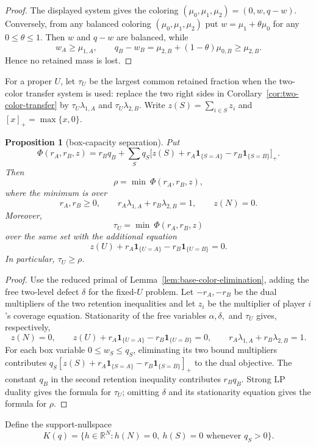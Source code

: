 \documentclass[11pt]{article}
\newtheorem{proposition}[theorem]{Proposition}
\begin{document}
\begin{proof}
The displayed system gives the coloring
$(\mu_0,\mu_1,\mu_2)=(0,w,q-w)$. Conversely, from any balanced coloring
$(\mu_0,\mu_1,\mu_2)$ put
$w=\mu_1+\theta\mu_0$ for any $0\leq\theta\leq1$. Then $w$ and $q-w$ are
balanced, while
\[
 w_A\geq\mu_{1,A},\qquad
 q_B-w_B=\mu_{2,B}+(1-\theta)\mu_{0,B}\geq\mu_{2,B}.
\]
Hence no retained mass is lost.
\end{proof}

For a proper $U$, let $\tau_U$ be the largest common retained fraction when
the two-color transfer system is used: replace the two right sides in
Corollary~\ref{cor:two-color-transfer} by
$\tau_U\lambda_{1,A}$ and $\tau_U\lambda_{2,B}$. Write
$z(S)=\sum_{i\in S}z_i$ and $[x]_+=\max\{x,0\}$.

\begin{proposition}[box-capacity separation]
\label{prop:box-capacity-dual}
Put
\[
 \Phi(r_A,r_B,z)=r_Bq_B+
 \sum_Sq_S\bigl[z(S)+r_A\mathbf1_{\{S=A\}}
                         -r_B\mathbf1_{\{S=B\}}\bigr]_+.
\]
Then
\[
 \rho=\min\ \Phi(r_A,r_B,z),
\]
where the minimum is over
\[
 r_A,r_B\geq0,\qquad
 r_A\lambda_{1,A}+r_B\lambda_{2,B}=1,\qquad z(N)=0.
\]
Moreover,
\[
 \tau_U=\min\ \Phi(r_A,r_B,z)
\]
over the same set with the additional equation
\[
 z(U)+r_A\mathbf1_{\{U=A\}}-r_B\mathbf1_{\{U=B\}}=0.
\]
In particular, $\tau_U\geq\rho$.
\end{proposition}

\begin{proof}
Use the reduced primal of Lemma~\ref{lem:base-color-elimination}, adding the
free two-level defect $\delta$ for the fixed-$U$ problem. Let $-r_A,-r_B$
be the dual multipliers of the two retention inequalities and let $z_i$ be
the multiplier of player $i$'s coverage equation. Stationarity of the free
variables $\alpha,\delta,$ and $\tau_U$ gives, respectively,
\[
 z(N)=0,\qquad
 z(U)+r_A\mathbf1_{\{U=A\}}-r_B\mathbf1_{\{U=B\}}=0,\qquad
 r_A\lambda_{1,A}+r_B\lambda_{2,B}=1.
\]
For each box variable $0\leq w_S\leq q_S$, eliminating its two bound
multipliers contributes
$q_S[z(S)+r_A\mathbf1_{\{S=A\}}-r_B\mathbf1_{\{S=B\}}]_+$ to the dual
objective. The constant $q_B$ in the second retention inequality contributes
$r_Bq_B$. Strong LP duality gives the formula for $\tau_U$; omitting
$\delta$ and its stationarity equation gives the formula for $\rho$.
\end{proof}

Define the support-nullspace
\[
 K(q)=\{h\in\mathbb R^N:h(N)=0,
                 \ h(S)=0\text{ whenever }q_S>0\}.
\]
\end{document}
